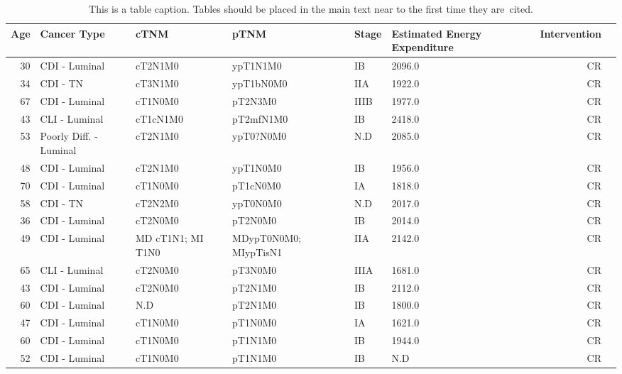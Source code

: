 \begin{longtable}{rlllllrl}
\caption{This is a table caption. Tables should be placed in the main text near to the first time they are~cited.\label{clinicaltable}}
\toprule
 Age &        Cancer Type & cTNM & pTNM & Stage &  Estimated Energy Expenditure & Intervention \\
\midrule
  30 & CDI - Luminal & cT2N1M0 & ypT1N1M0 & IB & 2096.0 & CR \\
  34 & CDI - TN & cT3N1M0 & ypT1bN0M0 &   IIA &  1922.0 & CR \\
  67 & CDI - Luminal & cT1N0M0 & pT2N3M0 &  IIIB &     1977.0 &   CR \\
  43 & CLI - Luminal & cT1cN1M0 &pT2mfN1M0 &    IB & 2418.0 &     CR \\
  53 & Poorly Diff. - Luminal &           cT2N1M0 &ypT0?N0M0 &   N.D &                        2085.0 &           CR \\
  48 & CDI - Luminal & cT2N1M0 &ypT1N0M0 &    IB &   1956.0 &           CR \\
  70 & CDI - Luminal & cT1N0M0 &              pT1cN0M0 &    IA &                        1818.0 &           CR \\
  58 & CDI - TN & cT2N2M0 &              ypT0N0M0 &   N.D &                        2017.0 &           CR \\
  36 & CDI - Luminal & cT2N0M0 &               pT2N0M0 &    IB &                        2014.0 &           CR \\
  49 & CDI - Luminal & MD cT1N1; MI T1N0 & MDypT0N0M0; MIypTisN1 &   IIA &                        2142.0 &           CR \\
  65 & CLI - Luminal &           cT2N0M0 &               pT3N0M0 &  IIIA &                        1681.0 &           CR \\
  43 & CDI - Luminal & cT2N0M0 &               pT2N1M0 &    IB &                        2112.0 &           CR \\
  60 & CDI - Luminal & N.D &               pT2N1M0 &    IB &                        1800.0 &           CR \\
  47 & CDI - Luminal & cT1N0M0 &               pT1N0M0 &    IA &                        1621.0 &           CR \\
  60 & CDI - Luminal & cT1N0M0 &               pT1N1M0 &    IB &                        1944.0 &           CR \\
  52 & CDI - Luminal & cT1N0M0 &               pT1N1M0 &    IB &                           N.D &           CR \\

\end{longtable}
